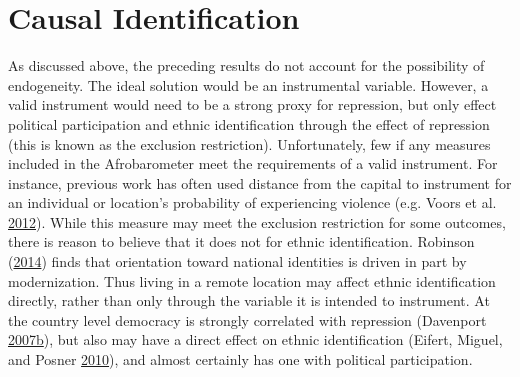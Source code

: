 \documentclass[12pt,]{book}
\theoremstyle{definition}
\theoremstyle{definition}
\theoremstyle{definition}
\theoremstyle{remark}
\begin{document}
\hypertarget{causal}{%
\section{Causal Identification}\label{causal}}

As discussed above, the preceding results do not account for the
possibility of endogeneity. The ideal solution would be an instrumental
variable. However, a valid instrument would need to be a strong proxy
for repression, but only effect political participation and ethnic
identification through the effect of repression (this is known as the
exclusion restriction). Unfortunately, few if any measures included in
the Afrobarometer meet the requirements of a valid instrument. For
instance, previous work has often used distance from the capital to
instrument for an individual or location's probability of experiencing
violence (e.g. Voors et al. \protect\hyperlink{ref-Voors2012}{2012}).
While this measure may meet the exclusion restriction for some outcomes,
there is reason to believe that it does not for ethnic identification.
Robinson (\protect\hyperlink{ref-Robinson2014}{2014}) finds that
orientation toward national identities is driven in part by
modernization. Thus living in a remote location may affect ethnic
identification directly, rather than only through the variable it is
intended to instrument. At the country level democracy is strongly
correlated with repression (Davenport
\protect\hyperlink{ref-Davenport2007a}{2007}\protect\hyperlink{ref-Davenport2007a}{b}),
but also may have a direct effect on ethnic identification (Eifert,
Miguel, and Posner \protect\hyperlink{ref-Eifert2010}{2010}), and almost
certainly has one with political participation.
\end{document}
